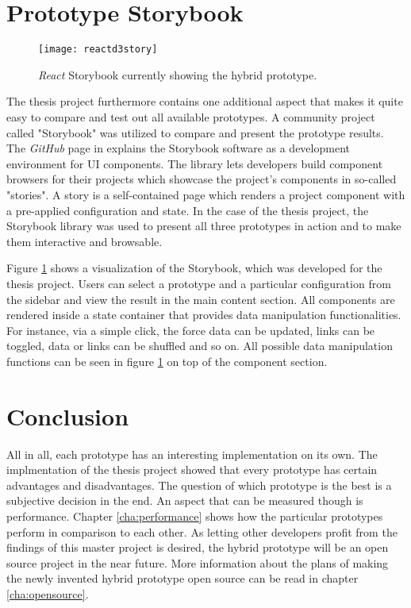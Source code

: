 \section{Prototype Storybook}

\begin{figure}
  \centering
  \texttt{[image: reactd3story]}
  \caption{\emph{React} Storybook currently showing the hybrid prototype.}
  \label{fig:reactD3stroy}
\end{figure}

The thesis project furthermore contains one additional aspect that makes it quite easy to compare and test out all available prototypes. A community project called "Storybook" was utilized to compare and present the prototype results. The \emph{GitHub} page in \cite{ReactStorybook} explains the Storybook software as a development environment for UI components. The library lets developers build component browsers for their projects which showcase the project's components in so-called "stories". A story is a self-contained page which renders a project component with a pre-applied configuration and state. In the case of the thesis project, the Storybook library was used to present all three prototypes in action and to make them interactive and browsable. 

Figure \ref{fig:reactD3stroy} shows a visualization of the Storybook, which was developed for the thesis project. Users can select a prototype and a particular configuration from the sidebar and view the result in the main content section. All components are rendered inside a state container that provides data manipulation functionalities. For instance, via a simple click, the force data can be updated, links can be toggled, data or links can be shuffled and so on. All possible data manipulation functions can be seen in figure \ref{fig:reactD3stroy} on top of the component section.

\section{Conclusion}

All in all, each prototype has an interesting implementation on its own. The implmentation of the thesis project showed that every prototype has certain advantages and disadvantages. The question of which prototype is the best is a subjective decision in the end. An aspect that can be measured though is performance. Chapter \ref{cha:performance} shows how the particular prototypes perform in comparison to each other. As letting other developers profit from the findings of this master project is desired, the hybrid prototype will be an open source project in the near future. More information about the plans of making the newly invented hybrid prototype open source can be read in chapter \ref{cha:opensource}.